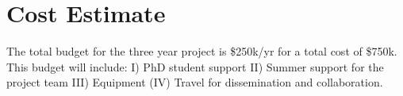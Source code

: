 \section{Cost Estimate} %
\vspace{-2mm}


The total budget for the three year project is \$250k/yr for a total cost of \$750k. This budget will include: I) PhD student support II) Summer support for the project team  III) Equipment (IV) Travel for dissemination and collaboration. %






			







			






